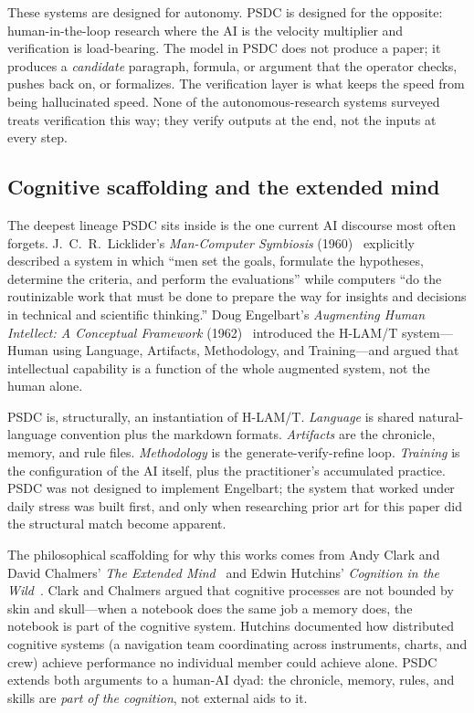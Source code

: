 \documentclass[12pt]{article}
\begin{document}
These systems are designed for autonomy. PSDC is designed for the opposite: human-in-the-loop research where the AI is the velocity multiplier and verification is load-bearing. The model in PSDC does not produce a paper; it produces a \emph{candidate} paragraph, formula, or argument that the operator checks, pushes back on, or formalizes. The verification layer is what keeps the speed from being hallucinated speed. None of the autonomous-research systems surveyed treats verification this way; they verify outputs at the end, not the inputs at every step.

\subsection{Cognitive scaffolding and the extended mind}

The deepest lineage PSDC sits inside is the one current AI discourse most often forgets. J.~C.~R.~Licklider's \emph{Man-Computer Symbiosis} (1960)~\cite{licklider} explicitly described a system in which ``men set the goals, formulate the hypotheses, determine the criteria, and perform the evaluations'' while computers ``do the routinizable work that must be done to prepare the way for insights and decisions in technical and scientific thinking.'' Doug Engelbart's \emph{Augmenting Human Intellect: A Conceptual Framework} (1962)~\cite{engelbart} introduced the H-LAM/T system---Human using Language, Artifacts, Methodology, and Training---and argued that intellectual capability is a function of the whole augmented system, not the human alone.

PSDC is, structurally, an instantiation of H-LAM/T. \emph{Language} is shared natural-language convention plus the markdown formats. \emph{Artifacts} are the chronicle, memory, and rule files. \emph{Methodology} is the generate-verify-refine loop. \emph{Training} is the configuration of the AI itself, plus the practitioner's accumulated practice. PSDC was not designed to implement Engelbart; the system that worked under daily stress was built first, and only when researching prior art for this paper did the structural match become apparent.

The philosophical scaffolding for why this works comes from Andy Clark and David Chalmers' \emph{The Extended Mind}~\cite{clarkchalmers} and Edwin Hutchins' \emph{Cognition in the Wild}~\cite{hutchins}. Clark and Chalmers argued that cognitive processes are not bounded by skin and skull---when a notebook does the same job a memory does, the notebook is part of the cognitive system. Hutchins documented how distributed cognitive systems (a navigation team coordinating across instruments, charts, and crew) achieve performance no individual member could achieve alone. PSDC extends both arguments to a human-AI dyad: the chronicle, memory, rules, and skills are \emph{part of the cognition}, not external aids to it.
\end{document}

